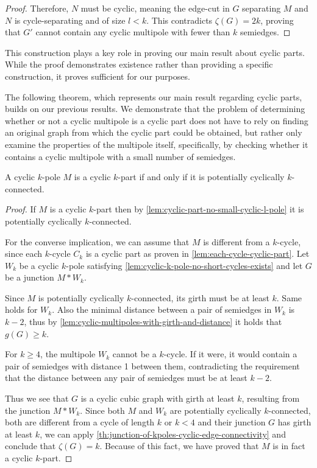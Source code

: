 \documentclass[12pt, twoside]{book}
\begin{document}
\begin{proof}
	Therefore, $N$ must be cyclic, meaning the edge-cut in $G$ separating $M$ and $N$ is cycle-separating and of size $l<k$. This contradicts $\zeta(G)=2k$, proving that $G'$ cannot contain any cyclic multipole with fewer than $k$ semiedges.
\end{proof}

This construction plays a key role in proving our main result about cyclic parts. While the proof demonstrates existence rather than providing a specific construction, it proves sufficient for our purposes.

The following theorem, which represents our main result regarding cyclic parts, builds on our previous results. We demonstrate that the problem of determining whether or not a cyclic multipole is a cyclic part does not have to rely on finding an original graph from which the cyclic part could be obtained, but rather only examine the properties of the multipole itself, specifically, by checking whether it contains a cyclic multipole with a small number of semiedges.

\begin{theorem}\label{th:alternative-definition-of-cyclic-part}
	A cyclic $k$-pole $M$ is a cyclic $k$-part if and only if it is potentially cyclically $k$-connected.
\end{theorem}

\begin{proof}
	If $M$ is a cyclic $k$-part then by \cref{lem:cyclic-part-no-small-cyclic-l-pole} it is potentially cyclically $k$-connected.
	
	For the converse implication, we can assume that $M$ is different from a $k$-cycle, since each $k$-cycle $C_k$ is a cyclic part as proven in \cref{lem:each-cycle-cyclic-part}. Let $W_k$ be a cyclic $k$-pole satisfying \cref{lem:cyclic-k-pole-no-short-cycles-exists} and let $G$ be a junction $M*W_k$.
	
	Since $M$ is potentially cyclically $k$-connected, its girth must be at least $k$. Same holds for $W_k$. Also the minimal distance between a pair of semiedges in $W_k$ is $k-2$, thus by \cref{lem:cyclic-multipoles-with-girth-and-distance} it holds that $g(G)\geq k$.
	
	For $k\geq 4$, the multipole $W_k$ cannot be a $k$-cycle. If it were, it would contain a pair of semiedges with distance 1 between them, contradicting the requirement that the distance between any pair of semiedges must be at least $k-2$.
	
	Thus we see that $G$ is a cyclic cubic graph with girth at least $k$, resulting from the junction ${M*W_k}$. Since both $M$ and $W_k$ are potentially cyclically \mbox{$k$-connected}, both are different from a cycle of length $k$ or $k<4$ and their junction $G$ has girth at least $k$, we can apply \cref{th:junction-of-kpoles-cyclic-edge-connectivity} and conclude that $\zeta(G)=k$. Because of this fact, we have proved that $M$ is in fact a cyclic $k$-part.
\end{proof}
\end{document}
